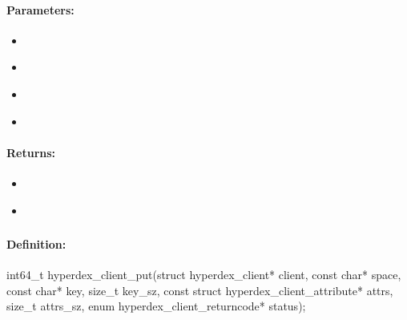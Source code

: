 \paragraph{Parameters:}
\begin{itemize}[noitemsep]
\item {}\\

\item {}\\

\item {}\\

\item {}\\

\end{itemize}

\paragraph{Returns:}
\begin{itemize}[noitemsep]
\item {}\\

\item {}\\

\end{itemize}

\pagebreak
\subsubsection{}
\label{api:c:put}


\paragraph{Definition:}
\begin{ccode}
int64_t hyperdex_client_put(struct hyperdex_client* client,
        const char* space,
        const char* key, size_t key_sz,
        const struct hyperdex_client_attribute* attrs, size_t attrs_sz,
        enum hyperdex_client_returncode* status);
\end{ccode}

